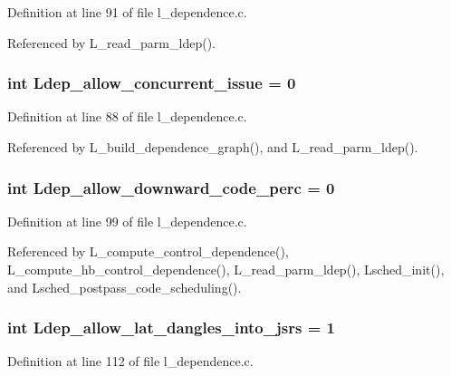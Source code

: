 Definition at line 91 of file l\_\-dependence.c.

Referenced by L\_\-read\_\-parm\_\-ldep().
\subsubsection{\setlength{\rightskip}{0pt plus 5cm}int \bf{Ldep\_\-allow\_\-concurrent\_\-issue} = 0}\label{l__dependence_8c_d41a47b60e195df743517b572422beb6}




Definition at line 88 of file l\_\-dependence.c.

Referenced by L\_\-build\_\-dependence\_\-graph(), and L\_\-read\_\-parm\_\-ldep().
\subsubsection{\setlength{\rightskip}{0pt plus 5cm}int \bf{Ldep\_\-allow\_\-downward\_\-code\_\-perc} = 0}\label{l__dependence_8c_a37236ab38b4dece3053ea2afdec5481}




Definition at line 99 of file l\_\-dependence.c.

Referenced by L\_\-compute\_\-control\_\-dependence(), L\_\-compute\_\-hb\_\-control\_\-dependence(), L\_\-read\_\-parm\_\-ldep(), Lsched\_\-init(), and Lsched\_\-postpass\_\-code\_\-scheduling().
\subsubsection{\setlength{\rightskip}{0pt plus 5cm}int \bf{Ldep\_\-allow\_\-lat\_\-dangles\_\-into\_\-jsrs} = 1}\label{l__dependence_8c_d193af86d66f9928071183d9bf7f3115}




Definition at line 112 of file l\_\-dependence.c.

